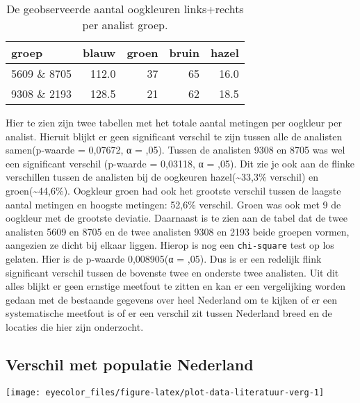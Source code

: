 \documentclass[
]{article}
\let\origfigure\figure
\let\endorigfigure\endfigure
\renewenvironment{figure}[1][2] {
    \expandafter\origfigure\expandafter[H]
} {
    \endorigfigure
}
\begin{document}
\begin{longtable}[t]{l|r|r|r|r}
\caption{\label{tab:eye-color-analist-group}De geobserveerde aantal oogkleuren links+rechts per analist groep.}\\
\hline
groep & blauw & groen & bruin & hazel\\
\hline
5609 \& 8705 & 112.0 & 37 & 65 & 16.0\\
\hline
9308 \& 2193 & 128.5 & 21 & 62 & 18.5\\
\hline
\end{longtable}

Hier te zien zijn twee tabellen met het totale aantal metingen per
oogkleur per analist. Hieruit blijkt er geen significant verschil te
zijn tussen alle de analisten samen(p-waarde = 0,07672, α = ,05). Tussen
de analisten 9308 en 8705 was wel een significant verschil (p-waarde =
0,03118, α = ,05). Dit zie je ook aan de flinke verschillen tussen de
analisten bij de oogkeuren hazel(\textasciitilde33,3\% verschil) en groen(\textasciitilde44,6\%).
Oogkleur groen had ook het grootste verschil tussen de laagste aantal
metingen en hoogste metingen: 52,6\% verschil. Groen was ook met 9 de
oogkleur met de grootste deviatie. Daarnaast is te zien aan de tabel dat
de twee analisten 5609 en 8705 en de twee analisten 9308 en 2193 beide
groepen vormen, aangezien ze dicht bij elkaar liggen. Hierop is nog een
\texttt{chi-square} test op los gelaten. Hier is de p-waarde 0,008905(α = ,05).
Dus is er een redelijk flink significant verschil tussen de bovenste
twee en onderste twee analisten. Uit dit alles blijkt er geen ernstige
meetfout te zitten en kan er een vergelijking worden gedaan met de
bestaande gegevens over heel Nederland om te kijken of er een
systematische meetfout is of er een verschil zit tussen Nederland breed
en de locaties die hier zijn onderzocht.

\hypertarget{verschil-met-populatie-nederland}{%
\subsection{Verschil met populatie Nederland}\label{verschil-met-populatie-nederland}}

\begin{figure}
\texttt{[image: eyecolor\_files/figure-latex/plot-data-literatuur-verg-1]} \caption{Barplot van totaal geobserveerde(frequentie) aantal per oogkleur over alle meerderheid gekozen oogkleuren.}\label{fig:plot-data-literatuur-verg}
\end{figure}
\end{document}
